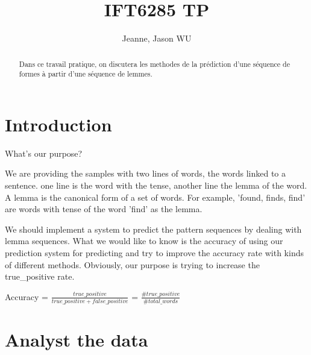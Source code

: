 \documentclass[a4paper]{article}
\title{IFT6285 TP}
\author{Jeanne, Jason WU}
\begin{document}
\maketitle

\begin{abstract}
Dans ce travail pratique,  on discutera les methodes de la prédiction d'une séquence de formes à partir d'une séquence de lemmes.
\end{abstract}

\section{Introduction}
What's our purpose?

We are providing the samples with two lines of words, the words linked to a sentence. one line is the word with the tense, another line the lemma of the word. A lemma is the canonical form of a set of words. For example, 'found, finds, find' are words with tense of the word 'find' as the lemma.

We should implement a system to predict the pattern sequences by dealing with lemma sequences. What we would like to know is the accuracy of using our prediction system for predicting and try to improve the accuracy rate with kinds of different methods. Obviously, our purpose is trying to increase the true\_positive rate. 

Accuracy = $\frac{true\_positive}{true\_positive + false\_positive}$ = $\frac{\#true\_positive}{\#total\_words}$

\section{Analyst the data}
\end{document}
